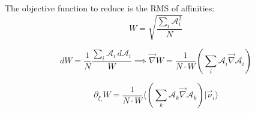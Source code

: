 \documentclass[aps,12pt]{revtex4}
\begin{document}
The objective function to reduce is the RMS of affinities:
\begin{equation}
	W = \sqrt{ \dfrac{\sum_i \mathcal A_i^2}{N} } 
\end{equation}

\begin{equation}
	dW = \dfrac{1}{N} \dfrac{\sum_i \mathcal A_i \, d \mathcal A_i}{W}
	\implies
	\vec \nabla W = \dfrac{1}{N\cdot W} \left( \sum_i \mathcal A_i \vec \nabla \mathcal A_i \right)
\end{equation}

\begin{equation}
\partial_{\xi_i} W = \dfrac{1}{N\cdot W} \langle \left( \sum_k \mathcal A_k \vec \nabla \mathcal A_k \right) \vert \vec \nu_i \rangle
\end{equation}
\end{document}
